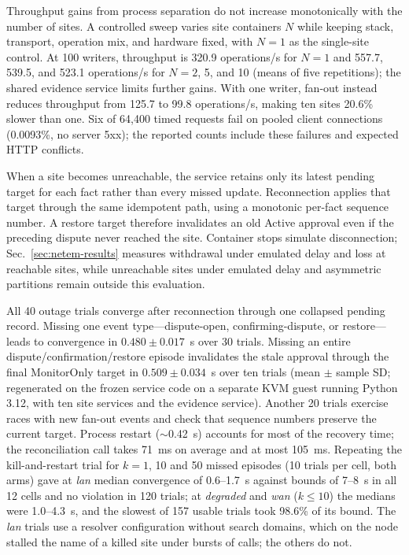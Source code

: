 \documentclass[journal]{IEEEtran}
\theoremstyle{definition}
\begin{document}
Throughput gains from process separation do not increase monotonically with the number of sites. A controlled sweep varies site containers $N$ while keeping stack, transport, operation mix, and hardware fixed, with $N=1$ as the single-site control. At 100 writers, throughput is 320.9 operations/s for $N=1$ and 557.7, 539.5, and 523.1 operations/s for $N=2$, 5, and 10 (means of five repetitions); the shared evidence service limits further gains. With one writer, fan-out instead reduces throughput from 125.7 to 99.8 operations/s, making ten sites 20.6\% slower than one. Six of 64,400 timed requests fail on pooled client connections (0.0093\%, no server 5xx); the reported counts include these failures and expected HTTP conflicts.

When a site becomes unreachable, the service retains only its latest pending target for each fact rather than every missed update. Reconnection applies that target through the same idempotent path, using a monotonic per-fact sequence number. A restore target therefore invalidates an old Active approval even if the preceding dispute never reached the site. Container stops simulate disconnection; Sec.~\ref{sec:netem-results} measures withdrawal under emulated delay and loss at reachable sites, while unreachable sites under emulated delay and asymmetric partitions remain outside this evaluation.

All 40 outage trials converge after reconnection through one collapsed pending record. Missing one event type---dispute-open, confirming-dispute, or restore---leads to convergence in $0.480\pm0.017$~s over 30 trials. Missing an entire dispute/confirmation/restore episode invalidates the stale approval through the final MonitorOnly target in $0.509\pm0.034$~s over ten trials (mean $\pm$ sample SD; regenerated on the frozen service code on a separate KVM guest running Python 3.12, with ten site services and the evidence service). Another 20 trials exercise races with new fan-out events and check that sequence numbers preserve the current target. Process restart ($\sim$0.42~s) accounts for most of the recovery time; the reconciliation call takes 71~ms on average and at most 105~ms.
Repeating the kill-and-restart trial for $k=1$, 10 and 50 missed episodes (10 trials per cell, both arms) gave at \emph{lan} median convergence of 0.6--1.7~s against bounds of 7--8~s in all 12 cells and no violation in 120 trials; at \emph{degraded} and \emph{wan} ($k\le10$) the medians were 1.0--4.3~s, and the slowest of 157 usable trials took 98.6\% of its bound. The \emph{lan} trials use a resolver configuration without search domains, which on the node stalled the name of a killed site under bursts of calls; the others do not.
\end{document}
